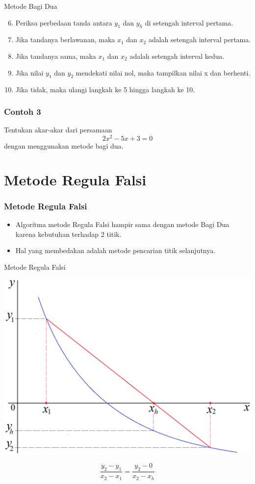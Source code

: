 \documentclass[pdflatex,compress]{beamer}
\begin{document}
\begin{frame}{Metode Bagi Dua}
	\begin{enumerate}
		\setcounter{enumi}{5}
		\item Periksa perbedaan tanda antara $ y_1 $ dan $ y_h $ di setengah interval pertama.
		\item Jika tandanya berlawanan, maka $ x_1 $ dan $ x_2 $ adalah setengah interval pertama.
		\item Jika tandanya sama, maka $ x_1 $ dan $ x_2 $ adalah setengah interval kedua.
		\item Jika nilai $ y_1 $ dan $ y_2 $ mendekati nilai nol, maka tampilkan nilai x dan berhenti.
		\item Jika tidak, maka ulangi langkah ke 5 hingga langkah ke 10.
	\end{enumerate}
\end{frame}

\begin{frame}
	\frametitle{Contoh 3}
	Tentukan akar-akar dari persamaan $$ 2x^2 - 5x + 3 = 0 $$ dengan menggunakan metode bagi dua.
\end{frame}

\section{Metode Regula Falsi}

\begin{frame}
	\frametitle{Metode Regula Falsi}
	\begin{itemize}
		\item Algoritma metode Regula Falsi hampir sama dengan metode Bagi Dua karena kebutuhan terhadap 2 titik.
		\item Hal yang membedakan adalah metode pencarian titik selanjutnya.
		
	\end{itemize}
\end{frame}

\begin{frame}{Metode Regula Falsi}
	\begin{center}
		\includegraphics[width=0.7\linewidth]{img/03}
	\end{center}
	$$ \frac{y_2 - y_1}{x_2 - x_1} = \frac{y_2 - 0}{x_2 - x_h} $$
\end{frame}
\end{document}

